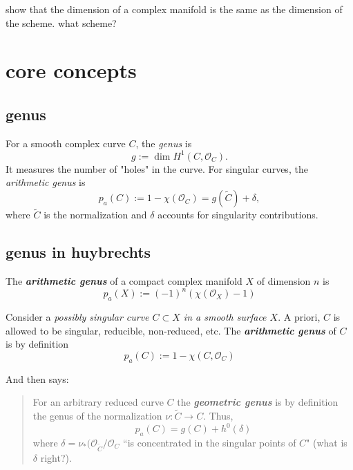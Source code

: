 \begin{exercise}\leavevmode
show that the dimension of a complex manifold is the same as the dimension of the scheme. what scheme?
\end{exercise}

 

\section{core concepts}

\subsection{genus}
For a smooth complex curve \( C \), the \emph{genus} is
\[
g := \dim H^1(C, \mathcal{O}_C).
\]
It measures the number of "holes" in the curve. For singular curves, the \emph{arithmetic genus} is
\[
p_a(C) := 1 - \chi(\mathcal{O}_C) = g(\widetilde{C}) + \delta,
\]
where \( \widetilde{C} \) is the normalization and \( \delta \) accounts for singularity contributions.

\subsection*{genus in huybrechts}
\begin{defn}\leavevmode
The \textit{\textbf{arithmetic genus}} of a compact complex manifold \(X\) of dimension \(n\) is
\[\boxed{p_a(X):=(-1)^n (\chi(\mathcal{O}_X)-1)}\]
\end{defn}

\begin{defn}\leavevmode
	Consider a \textit{possibly singular curve \(C \subset X\) in a smooth surface \(X\)}. A priori, \(C\) is allowed to be singular, reducible, non-reduced, etc. The \textit{\textbf{arithmetic genus}} of \(C\) is by definition
	\[\boxed{p_a(C):= 1 - \chi(C, \mathcal{O}_C)}\]
\end{defn}

And then \cite{huk} says:
\begin{quotation}
For an arbitrary reduced curve \(C\) the \textit{\textbf{geometric genus}} is by definition the genus of the normalization \(\nu:\tilde{C} \to C\). Thus, \[\boxed{p_a(C)=g(C)+h^{0}(\delta)}\]
where \(\delta=\nu_*(\mathcal{O}_{\tilde{C}}/\mathcal{O}_C\) ``is concentrated in the singular points of \(C\)" (what is \(\delta\) right?).
\end{quotation}

